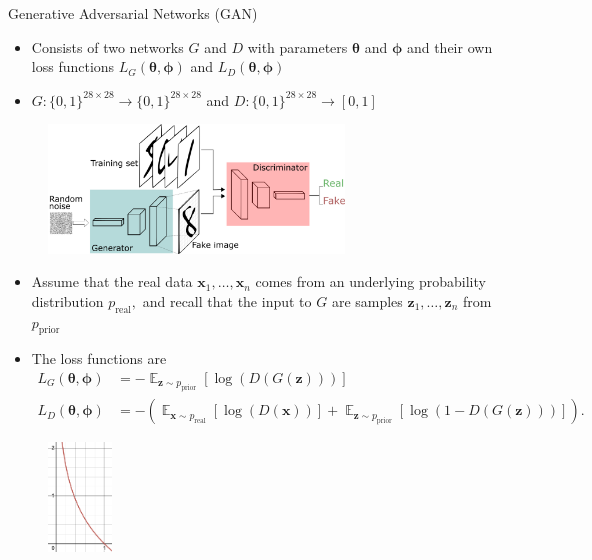 \documentclass[xcolor=dvipsnames]{beamer}
\DeclareMathOperator*{\E}{\mathbb{E}}
\begin{document}
\begin{frame}{Generative Adversarial Networks (GAN)}

  \begin{itemize}
    \item Consists of two networks $G$ and $D$ with parameters $\bm{\theta}$ and $\bm{\phi}$ and their own loss functions $L_G(\bm{\theta},\bm{\phi})$ and $L_D(\bm{\theta},\bm{\phi})$
    \item $G:\{0,1\}^{28\times 28}\to\{0,1\}^{28\times 28}$ and $D:\{0,1\}^{28\times 28}\to [0,1]$
  \end{itemize}

  \begin{figure}
    \centering
    \includegraphics[width=0.7\textwidth]{GANs.png}
  \end{figure}

\end{frame}

\begin{frame}

  \begin{itemize}
    \item Assume that the real data $\bm{x}_1,\ldots,\bm{x}_n$ comes from an underlying probability distribution $p_{\text{real}},$ and recall that the input to $G$ are samples $\bm{z}_1,\ldots,\bm{z}_n$ from $p_{\text{prior}}$
    \item The loss functions are 
    \begin{align*}
      L_G(\bm{\theta},\bm{\phi})&=-\E_{\bm{z}\sim p_{\text{prior}}}\left[\log(D(G(\bm{z})))\right]\\
      L_D(\bm{\theta},\bm{\phi})&=-\left(\E_{\bm{x}\sim p_{\text{real}}}\left[\log(D(\bm{x}))\right]+\E_{\bm{z}\sim p_{\text{prior}}}\left[\log(1-D(G(\bm{z})))\right]\right).
    \end{align*}
  \end{itemize}

  \begin{figure}
    \centering
    \includegraphics[width=0.15\textwidth]{neglog.png}
  \end{figure}

\end{frame}
  
\end{document}
